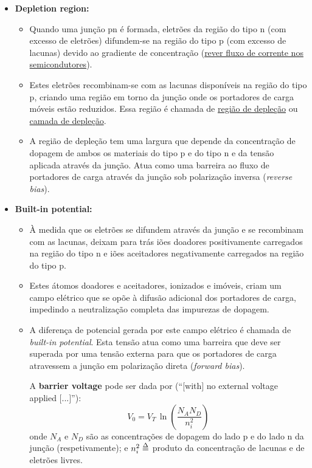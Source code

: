 \newpage
\begin{itemize}[leftmargin=*, nolistsep]
    \item \textbf{Depletion region:}
    \begin{itemize}[label=$\blacktriangle$, leftmargin=*]
        \item Quando uma junção pn é formada, eletrões da região do tipo n (com excesso de eletrões) difundem-se na região do tipo p (com excesso de lacunas) devido ao gradiente de concentração (\hyperref[subsec:current-flow-semiconductors]{rever fluxo de corrente nos semicondutores}).
        \item Estes eletrões recombinam-se com as lacunas disponíveis na região do tipo p, criando uma região em torno da junção onde os portadores de carga móveis estão reduzidos. Essa região é chamada de \underline{região de depleção} ou \underline{camada de depleção}.
        \item A região de depleção tem uma largura que depende da concentração de dopagem de ambos os materiais do tipo p e do tipo n e da tensão aplicada através da junção. Atua como uma barreira ao fluxo de portadores de carga através da junção sob polarização inversa (\textit{reverse bias}).
    \end{itemize}

    \item \textbf{Built-in potential:}
    \begin{itemize}[label=$\blacktriangle$, leftmargin=*]
    \item À medida que os eletrões se difundem através da junção e se recombinam com as lacunas, deixam para trás iões doadores positivamente carregados na região do tipo n e iões aceitadores negativamente carregados na região do tipo p.
    \item Estes átomos doadores e aceitadores, ionizados e imóveis, criam um campo elétrico que se opõe à difusão adicional dos portadores de carga, impedindo a neutralização completa das impurezas de dopagem.
    \item A diferença de potencial gerada por este campo elétrico é chamada de \textit{built-in potential}. Esta tensão atua como uma barreira que deve ser superada por uma tensão externa para que os portadores de carga atravessem a junção em polarização direta (\textit{forward bias}). 
    
    A \textbf{barrier voltage} pode ser dada por (``$[$with$]$ no external voltage applied $[$...$]$''\cite{sedra-smith:microelectronic-circuits}):
    $$
        V_0 = V_T\, \ln\left(\frac{N_A N_D}{n^{2}_{i}}\right)
    $$
    onde $N_A$ e $N_D$ são as concentrações de dopagem do lado p e do lado n da junção (respetivamente); e $n^{2}_{i} \delequal$ produto da concentração de lacunas e de eletrões livres.
    \end{itemize}


\end{itemize}
